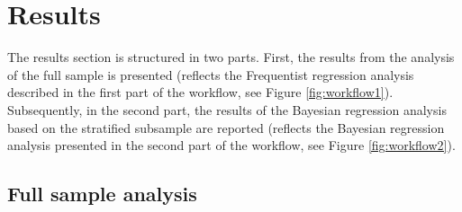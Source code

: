 \documentclass[12pt,twoside]{reedthesis}
\begin{document}
\hypertarget{results}{%
\chapter{Results}\label{results}}

The results section is structured in two parts. First, the results from the analysis of the full sample is presented (reflects the Frequentist regression analysis described in the first part of the workflow, see Figure \ref{fig:workflow1}). Subsequently, in the second part, the results of the Bayesian regression analysis based on the stratified subsample are reported (reflects the Bayesian regression analysis presented in the second part of the workflow, see Figure \ref{fig:workflow2}).

\hypertarget{full_results}{%
\section{Full sample analysis}\label{full_results}}
\end{document}
